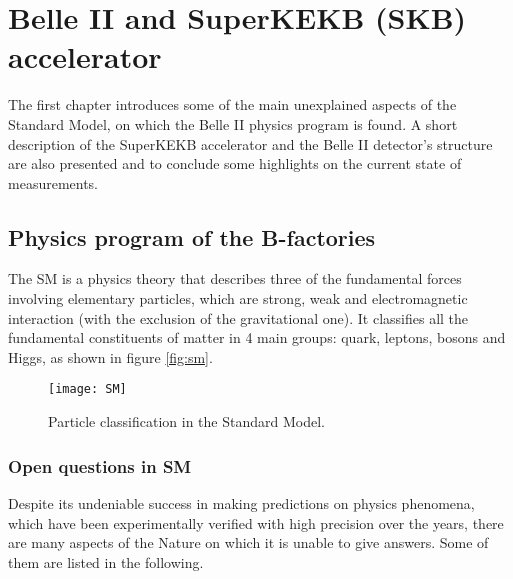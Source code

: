 
\chapter{Belle II and SuperKEKB (SKB) accelerator}

The first chapter introduces some of the main unexplained aspects of the Standard Model, on which the Belle II physics program is found. A short description of the SuperKEKB accelerator and the Belle II detector's structure are also presented and to conclude some highlights on the current state of measurements.


\section{Physics program of the B-factories}

The SM is a physics theory that describes three of the fundamental forces involving elementary particles, which are strong, weak and electromagnetic interaction (with the exclusion of the gravitational one). It classifies all the fundamental constituents of matter in 4 main groups: quark, leptons, bosons and Higgs, as shown in figure \vref{fig:sm}.


\begin{figure}[h]
\centering
\texttt{[image: SM]}
\caption{Particle classification in the Standard Model.}
\label{fig:sm}
\end{figure}




\subsection{Open questions in SM}


Despite its undeniable success in making predictions on physics phenomena, which have been experimentally verified with high precision over the years, there are many aspects of the Nature on which it is unable to give answers. Some of them are listed in the following.

